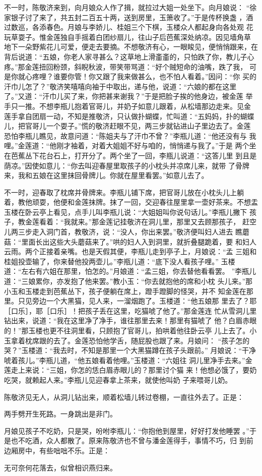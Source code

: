 不一时，陈敬济来到，向月娘众人作了揖，就拉过大姐一处坐下。向月娘说：
“徐家银子讨了来了，共五封二百五十两，送到房里，玉箫收了。”于是传杯换盏
，酒过数巡，各添春色。月娘与李娇儿、桂姐三个下棋，玉楼众人都起身向各处观
花玩草耍子。惟金莲独自手摇着白团纱扇儿，往山子后芭蕉深处纳凉。因见墙角草
地下一朵野紫花儿可爱，便走去要摘。不想敬济有心，一眼睃见，便悄悄跟来，在
背后说道：“五娘，你老人家寻甚么？这草地上滑齑齑的，只怕跌了你，教儿子心
疼。”那金莲扭回粉颈，斜睨秋波，带笑带骂道：“好个贼短命的油嘴，跌了我，
可是你就心疼哩？谁要你管！你又跟了我来做甚么，也不怕人看着。”因问：“你
买的汗巾儿怎了？”敬济笑嘻嘻向袖于中取出，递与他，说道：“六娘的都在这里
了。”又道：“汗巾儿买了来，你把甚来谢我？”于是把脸子挨的他身边，被金莲
举手只一推。不想李瓶儿抱着官哥儿，并奶子如意儿跟着，从松墙那边走来。见金
莲手拿自团扇一动，不知是推敬济，只认做扑蝴蝶，忙叫道：“五妈妈，扑的蝴蝶
儿，把官哥儿一个耍子。”慌的敬济赶眼不见，两三步就钻进山子里边去了。金莲
恐怕李瓶儿瞧见，故意问道：“陈姐夫与了汗巾不曾？”李瓶儿道：“他还没有与
我哩。”金莲道：“他刚才袖着，对着大姐姐不好与咱的，悄悄递与我了。”于是
两个坐在芭蕉丛下花台石上，打开分了。两个坐了一回，李瓶儿说道：“这答儿里
到且是荫凉。”因使如意儿：“你去叫迎春屋里取孩子的小枕头并凉席儿来，就带
了骨牌来，我和五娘在这里抹回骨牌儿。你就在屋里看罢。”如意儿去了。

不一时，迎春取了枕席并骨牌来。李瓶儿铺下席，把官哥儿放在小枕头儿上躺
着，教他顽耍，他便和金莲抹牌。抹了一回，交迎春往屋里拿一壶好茶来。不想盂
玉楼在卧云亭上看见，点手儿叫李瓶儿说：“大姐姐叫你说句话儿。”李瓶儿撇下
孩子，教金莲看着：“我就来。”那金莲记挂敬济在洞儿里，那里又去顾那孩子，
赶空儿两三步走入洞门首，教敬济，说：“没人，你出来罢。”敬济便叫妇人进去
瞧蘑菇：“里面长出这些大头蘑菇来了。”哄的妇人入到洞里，就折叠腿跪着，要
和妇人云雨。两个正接着亲嘴。也是天假其便，李瓶儿走到亭子上，月娘说：“孟
三姐和桂姐投壶输了，你来替他投两壶儿。”李瓶儿道：“底下没人看孩子哩。”
玉楼道：“左右有六姐在那里，怕怎的。”月娘道：“孟三姐，你去替他看看罢。
”李瓶儿道：“三娘累你，亦发抱了他来罢。”教小玉：“你去就抱他的席和小枕
头儿来。”那小玉和玉楼走到芭蕉丛下，孩子便躺在席上，蹬手蹬脚的怪哭，并不
知金莲在那里。只见旁边一个大黑猫，见人来，一溜烟跑了。玉楼道：“他五娘那
里去了？耶［口乐］，耶［口乐］！把孩子丢在这里，吃猫唬了他了。”那金莲连
忙从雪洞儿里钻出来，说道：“我在这里净了净手，谁往那里去来！那里有猫唬了
他？白眉赤眼的！”那玉楼也更不往洞里看，只顾抱了官哥儿，拍哄着他往卧云亭
儿上去了。小玉拿着枕席跟的去了。金莲恐怕他学舌，随屁股也跟了来。月娘问：
“孩子怎的哭？”玉楼道：“我去时，不知是那里一个大黑猫蹲在孩子头跟前。”
月娘说：“干净唬着孩儿。”李瓶儿道，“他五娘看着他哩。”玉楼道：“六姐往
洞儿里净手去来。”金莲走上来说：“三姐，你怎的恁白眉赤眼儿的？那里讨个猫
来！他想必饿了，要奶吃哭，就赖起人来。”李瓶儿见迎春拿上茶来，就使他叫奶
子来喂哥儿奶。

陈敬济见无人，从洞儿钻出来，顺着松墙儿转过卷棚，一直往外去了。正是：

两手劈开生死路。一身跳出是非门。

月娘见孩子不吃奶，只是哭，吩咐李瓶儿：“你抱他到屋里，好好打发他睡罢
。”于是也不吃酒，众人都散了。原来陈敬济也不曾与潘金莲得手，事情不巧，归
到前边厢房中，有些咄咄不乐。正是：

无可奈何花落去，似曾相识燕归来。